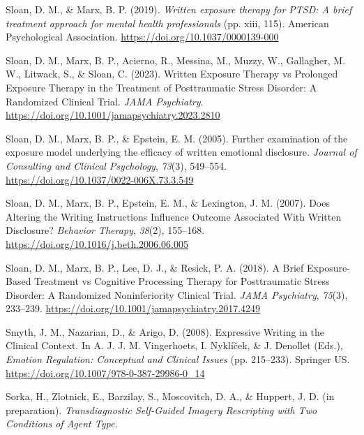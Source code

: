 \documentclass[
  man,floatsintext]{apa7}
\newlength{\cslhangindent}
\newlength{\cslentryspacingunit} %
\newenvironment{CSLReferences}[2] %
 {%
  \setlength{\parindent}{0pt}
  \ifodd #1
  \let\oldpar\par
  \def\par{\hangindent=\cslhangindent\oldpar}
  \fi
  \setlength{\parskip}{#2\cslentryspacingunit}
 }%
 {}
\begin{document}
\begin{CSLReferences}{1}{0}
\leavevmode{}%
Sloan, D. M., \& Marx, B. P. (2019). \emph{Written exposure therapy for PTSD: A brief treatment approach for mental health professionals} (pp. xiii, 115). American Psychological Association. \url{https://doi.org/10.1037/0000139-000}

\leavevmode{}%
Sloan, D. M., Marx, B. P., Acierno, R., Messina, M., Muzzy, W., Gallagher, M. W., Litwack, S., \& Sloan, C. (2023). Written Exposure Therapy vs Prolonged Exposure Therapy in the Treatment of Posttraumatic Stress Disorder: A Randomized Clinical Trial. \emph{JAMA Psychiatry}. \url{https://doi.org/10.1001/jamapsychiatry.2023.2810}

\leavevmode{}%
Sloan, D. M., Marx, B. P., \& Epstein, E. M. (2005). Further examination of the exposure model underlying the efficacy of written emotional disclosure. \emph{Journal of Consulting and Clinical Psychology}, \emph{73}(3), 549--554. \url{https://doi.org/10.1037/0022-006X.73.3.549}

\leavevmode{}%
Sloan, D. M., Marx, B. P., Epstein, E. M., \& Lexington, J. M. (2007). Does Altering the Writing Instructions Influence Outcome Associated With Written Disclosure? \emph{Behavior Therapy}, \emph{38}(2), 155--168. \url{https://doi.org/10.1016/j.beth.2006.06.005}

\leavevmode{}%
Sloan, D. M., Marx, B. P., Lee, D. J., \& Resick, P. A. (2018). A Brief Exposure-Based Treatment vs Cognitive Processing Therapy for Posttraumatic Stress Disorder: A Randomized Noninferiority Clinical Trial. \emph{JAMA Psychiatry}, \emph{75}(3), 233--239. \url{https://doi.org/10.1001/jamapsychiatry.2017.4249}

\leavevmode{}%
Smyth, J. M., Nazarian, D., \& Arigo, D. (2008). Expressive Writing in the Clinical Context. In A. J. J. M. Vingerhoets, I. Nyklíček, \& J. Denollet (Eds.), \emph{Emotion Regulation: Conceptual and Clinical Issues} (pp. 215--233). Springer US. \url{https://doi.org/10.1007/978-0-387-29986-0_14}

\leavevmode{}%
Sorka, H., Zlotnick, E., Barzilay, S., Moscovitch, D. A., \& Huppert, J. D. (in preparation). \emph{Transdiagnostic Self-Guided Imagery Rescripting with Two Conditions of Agent Type.}


\end{CSLReferences}
\end{document}
